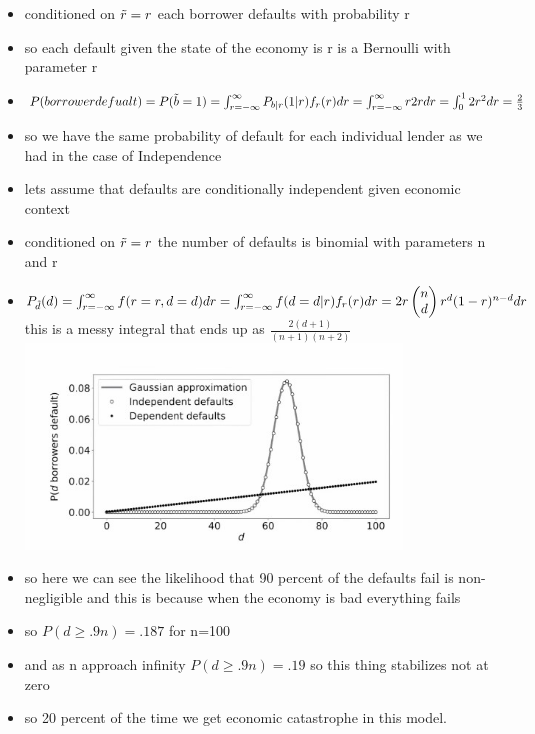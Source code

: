 \documentclass{article}
\begin{document}
\begin{itemize}
\item conditioned on $\Tilde{r}=r$ each borrower defaults with probability r
\item so each default given the state of the economy is r  is a Bernoulli with parameter r 
\item $P(borrower defualt)=P(\Tilde{b}=1)=\int_{r=-\infty}^{\infty}P_{b|r}(1|r)f_{r}(r)dr=\int_{r=-\infty}^{\infty}r2rdr=\int_{0}^{1}2r^2dr=\frac{2}{3}$
\item so we have the same probability of default for each individual lender as we had in the case of Independence 
\item lets assume that defaults are conditionally independent given economic context
\item conditioned on $\Tilde{r}=r$ the number of defaults is binomial with parameters n and r 
\item $P_{\Tilde{d}}(d)=\int_{r=-\infty}^{\infty}f(r=r,d=d)dr=\int_{r=-\infty}^{\infty}f(d=d|r)f_{r}(r)dr=2r\begin{pmatrix}n\\d\end{pmatrix} r^{d}(1-r)^{n-d}dr$ this is a messy integral that ends up as $\frac{2(d+1)}{(n+1)(n+2)}$
\includegraphics[width=10cm]{notes/week_4/vidio 3:How Not To Estimate Ris/immages/v_3_3.jpg}
\item so here we can see the likelihood that 90 percent of the defaults fail is non-negligible and this is because when the economy is bad everything fails 
\item so $P(d\geq .9n)=.187$ for n=100
\item and as n approach infinity $P(d\geq .9n)=.19$ so this thing stabilizes not at zero
\item so 20 percent of the time we get economic catastrophe in this model. 
\end{itemize}
\end{document}
